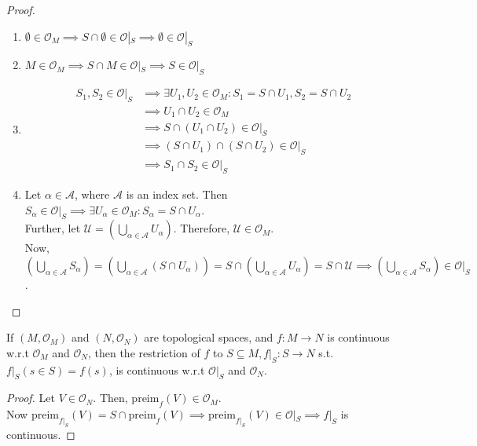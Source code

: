 \begin{proof}
\begin{enumerate}
\item $\emptyset \in \mathcal{O}_{M} \implies S \cap \emptyset \in \mathcal{O}|_S \implies \emptyset \in \mathcal{O}|_S$
\item $M \in \mathcal{O}_{M} \implies S \cap M \in \mathcal{O}|_S \implies S \in \mathcal{O}|_S$
\item \begin{align*}
S_1, S_2 \in \mathcal{O}|_S &\implies \exists U_1, U_2 \in \mathcal{O}_{M} : S_1 = S \cap U_1, S_2 = S \cap U_2 \\
&\implies U_1 \cap U_2 \in \mathcal{O}_{M} \\
&\implies S \cap (U_1 \cap U_2) \in \mathcal{O}|_S \\
&\implies (S \cap U_1) \cap (S \cap U_2) \in \mathcal{O}|_S \\
&\implies S_1 \cap S_2 \in \mathcal{O}|_S
\end{align*}
\item Let $\alpha \in \mathcal{A}$, where $\mathcal{A}$ is an index set. Then $S_{\alpha} \in \mathcal{O}|_S \implies \exists U_{\alpha} \in \mathcal{O}_{M} : S_{\alpha} = S \cap U_{\alpha}$. \\
Further, let $\mathcal{U} = \left( \bigcup_{\alpha \in \mathcal{A}} U_{\alpha} \right)$. Therefore, $\mathcal{U} \in \mathcal{O}_{M}$. \\
Now, $\left( \bigcup_{\alpha \in \mathcal{A}} S_{\alpha} \right) = \left( \bigcup_{\alpha \in \mathcal{A}} (S \cap U_{\alpha}) \right) = S \cap \left( \bigcup_{\alpha \in \mathcal{A}} U_{\alpha} \right) = S \cap \mathcal{U} \implies \left( \bigcup_{\alpha \in \mathcal{A}} S_{\alpha} \right) \in \mathcal{O}|_S$.
\end{enumerate}
\end{proof}

\begin{theorem}
If $(M, \mathcal{O}_{M})$ and $(N, \mathcal{O}_{N})$ are topological spaces, and $f: M \to N$ is continuous w.r.t $\mathcal{O}_{M}$ and $\mathcal{O}_{N}$, then the restriction of $f$ to $S \subseteq M, f|_S: S \to N$ s.t. $f|_S(s \in S) = f(s)$, is continuous w.r.t $\mathcal{O}|_S$ and $\mathcal{O}_{N}$.
\end{theorem}

\begin{proof}
Let $V \in \mathcal{O}_N$. Then, $\text{preim}_{f}(V) \in \mathcal{O}_M$. \\
Now $\text{preim}_{f|_S}(V) = S \cap \text{preim}_{f}(V) \implies \text{preim}_{f|_S}(V) \in \mathcal{O}|_S \implies f|_S$ is continuous. 
\end{proof}
